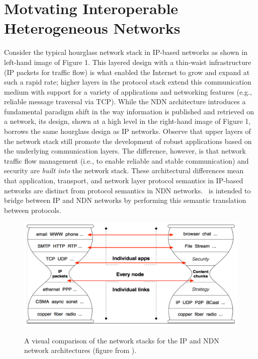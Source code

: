 \section{Motvating Interoperable Heterogeneous Networks}
Consider the typical hourglass network stack in IP-based networks as shown in left-hand image of Figure 1. This layered design with a thin-waist infrastructure (IP packets for traffic flow) is what enabled the Internet to grow and expand at such a rapid rate; higher layers in the protocol stack extend this communication medium with support for a variety of applications and networking features (e.g., reliable message traversal via TCP). While the NDN architecture introduces a fundamental paradigm shift in the way information is published and retrieved on a network, its design, shown at a high level in the right-hand image of Figure 1, borrows the same hourglass design as IP networks. Observe that upper layers of the network stack still promote the development of robust applications based on the underlying communication layers. The difference, however, is that network traffic flow management (i.e., to enable reliable and stable communication) and security are \emph{built into} the network stack. These architectural differences mean that application, transport, and network layer protocol semantics in IP-based networks are distinct from protocol semantics in NDN networks. \sink\ is intended to bridge between IP and NDN networks by performing this semantic translation between protocols. 

\begin{figure}[ht!]
\begin{center}
\includegraphics[scale=0.45]{./images/hourglass_conn.pdf}
\label{fig:hourglass}
\caption{A visual comparison of the network stacks for the IP and NDN network architectures (figure from \cite{ndn-techreport}).}
\end{center}
\end{figure}

